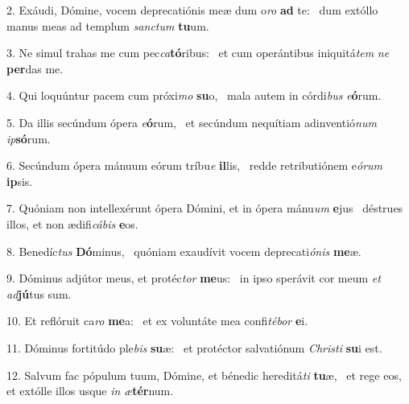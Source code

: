 2. Exáudi, Dómine, vocem deprecatiónis meæ dum o\textit{ro} \textbf{ad} te: \ast\  dum extóllo manus meas ad templum \textit{sanc}\textit{tum} \textbf{tu}um.\

3. Ne simul trahas me cum pec\textit{ca}\textbf{tó}ribus: \ast\  et cum operántibus iniquitá\textit{tem} \textit{ne} \textbf{per}das me.\

4. Qui loquúntur pacem cum próxi\textit{mo} \textbf{su}o, \ast\  mala autem in córdi\textit{bus} \textit{e}\textbf{ó}rum.\

5. Da illis secúndum ópera \textit{e}\textbf{ó}rum, \ast\  et secúndum nequítiam adinventió\textit{num} \textit{ip}\textbf{só}rum.\

6. Secúndum ópera mánuum eórum tríbu\textit{e} \textbf{il}lis, \ast\  redde retributiónem e\textit{ó}\textit{rum} \textbf{ip}sis.\

7. Quóniam non intellexérunt ópera Dómini, et in ópera mánu\textit{um} \textbf{e}jus \ast\  déstrues illos, et non ædifi\textit{cá}\textit{bis} \textbf{e}os.\

8. Benedíc\textit{tus} \textbf{Dó}minus, \ast\  quóniam exaudívit vocem deprecati\textit{ó}\textit{nis} \textbf{me}æ.\

9. Dóminus adjútor meus, et protéc\textit{tor} \textbf{me}us: \ast\  in ipso sperávit cor meum \textit{et} \textit{ad}\textbf{jú}tus sum.\

10. Et reflóruit ca\textit{ro} \textbf{me}a: \ast\  et ex voluntáte mea confi\textit{té}\textit{bor} \textbf{e}i.\

11. Dóminus fortitúdo ple\textit{bis} \textbf{su}æ: \ast\  et protéctor salvatiónum \textit{Chris}\textit{ti} \textbf{su}i est.\

12. Salvum fac pópulum tuum, Dómine, et bénedic hereditá\textit{ti} \textbf{tu}æ, \ast\  et rege eos, et extólle illos usque \textit{in} \textit{æ}\textbf{tér}num.\

